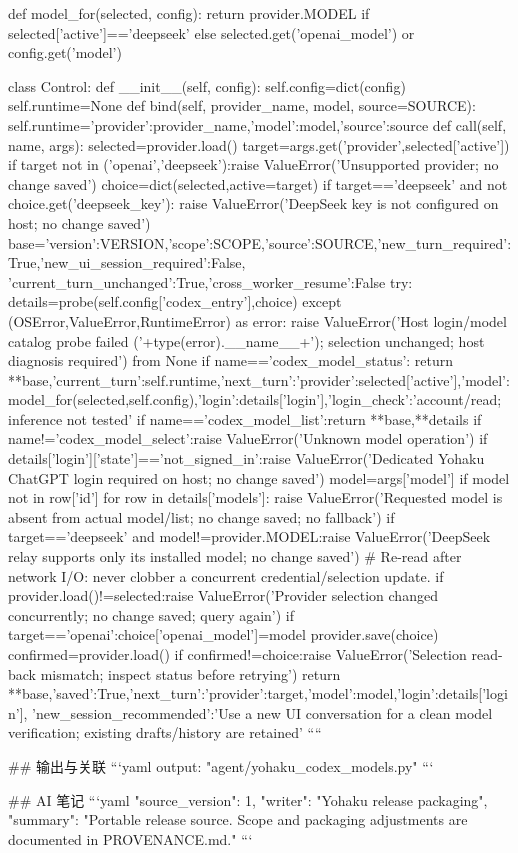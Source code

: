 def model_for(selected, config):
    return provider.MODEL if selected['active']=='deepseek' else selected.get('openai_model') or config.get('model')

class Control:
    def __init__(self, config):
        self.config=dict(config)
        self.runtime=None
    def bind(self, provider_name, model, source=SOURCE):
        self.runtime={'provider':provider_name,'model':model,'source':source}
    def call(self, name, args):
        selected=provider.load()
        target=args.get('provider',selected['active'])
        if target not in ('openai','deepseek'):raise ValueError('Unsupported provider; no change saved')
        choice=dict(selected,active=target)
        if target=='deepseek' and not choice.get('deepseek_key'):
            raise ValueError('DeepSeek key is not configured on host; no change saved')
        base={'version':VERSION,'scope':SCOPE,'source':SOURCE,'new_turn_required':True,'new_ui_session_required':False,
              'current_turn_unchanged':True,'cross_worker_resume':False}
        try:
            details=probe(self.config['codex_entry'],choice)
        except (OSError,ValueError,RuntimeError) as error:
            raise ValueError('Host login/model catalog probe failed ('+type(error).__name__+'); selection unchanged; host diagnosis required') from None
        if name=='codex_model_status':
            return {**base,'current_turn':self.runtime,'next_turn':{'provider':selected['active'],'model':model_for(selected,self.config)},'login':details['login'],'login_check':'account/read; inference not tested'}
        if name=='codex_model_list':return {**base,**details}
        if name!='codex_model_select':raise ValueError('Unknown model operation')
        if details['login']['state']=='not_signed_in':raise ValueError('Dedicated Yohaku ChatGPT login required on host; no change saved')
        model=args['model']
        if model not in {row['id'] for row in details['models']}:
            raise ValueError('Requested model is absent from actual model/list; no change saved; no fallback')
        if target=='deepseek' and model!=provider.MODEL:raise ValueError('DeepSeek relay supports only its installed model; no change saved')
        # Re-read after network I/O: never clobber a concurrent credential/selection update.
        if provider.load()!=selected:raise ValueError('Provider selection changed concurrently; no change saved; query again')
        if target=='openai':choice['openai_model']=model
        provider.save(choice)
        confirmed=provider.load()
        if confirmed!=choice:raise ValueError('Selection read-back mismatch; inspect status before retrying')
        return {**base,'saved':True,'next_turn':{'provider':target,'model':model},'login':details['login'],
                'new_session_recommended':'Use a new UI conversation for a clean model verification; existing drafts/history are retained'}
````

## 输出与关联
```yaml
output: "agent/yohaku_codex_models.py"
```

## AI 笔记
```yaml
{"source_version": 1, "writer": "Yohaku release packaging", "summary": "Portable release source. Scope and packaging adjustments are documented in PROVENANCE.md."}
```
